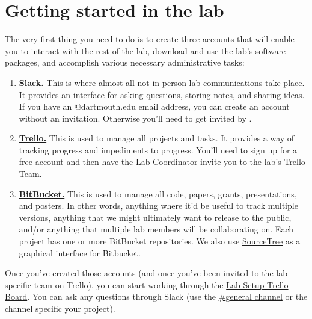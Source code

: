 \documentclass{tufte-book} %
\begin{document}
\section{Getting started in the lab}
The very first thing you need to do is to create three accounts that
will enable you to interact with the rest of the lab, download and use
the lab's software packages, and accomplish various necessary
administrative tasks:
\begin{enumerate}
\item \href{https://context-lab.slack.com}{\textbf{Slack.}}  This is where
  almost all not-in-person lab communications take place.  It provides
  an interface for asking questions, storing notes, and sharing
  ideas.  If you have an @dartmouth.edu email address, you can create
  an account without an invitation.  Otherwise you'll need to get invited by \coordinator.

\item \href{https://www.trello.com}{\textbf{Trello.}}
    This is used to manage all projects and tasks.  It
  provides a way of tracking progress and impediments to progress.
  You'll need to sign up for a free account and then have the Lab
  Coordinator invite you to the lab's Trello Team.

\item \href{https://www.bitbucket.org}{\textbf{BitBucket.}}
    This is used to manage all code, papers, grants,
  presentations, and posters.  In other words, anything where it'd be
  useful to track multiple versions, anything that we might ultimately
  want to release to the public, and/or anything that multiple lab
  members will be collaborating on.  Each project has one or more
  BitBucket repositories.  We also use
  \href{https://www.atlassian.com/software/sourcetree}{SourceTree} as
  a graphical interface for Bitbucket.
\end{enumerate}

Once you've created those accounts (and once you've been invited to
the lab-specific team on Trello), you can start working through the
\href{https://trello.com/b/Mgs45iEJ/lab-setup}{Lab Setup Trello
  Board}.  You can ask any questions through Slack (use the \href{https://context-lab.slack.com/messages/general/}{\#general
channel} or the channel specific your project).
\end{document}
